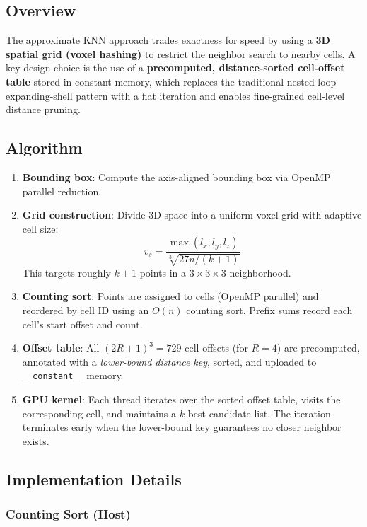 \documentclass[11pt,a4paper]{article}
\begin{document}
\subsection{Overview}

The approximate KNN approach trades exactness for speed by using a \textbf{3D spatial grid (voxel hashing)} to restrict the neighbor search to nearby cells. A key design choice is the use of a \textbf{precomputed, distance-sorted cell-offset table} stored in constant memory, which replaces the traditional nested-loop expanding-shell pattern with a flat iteration and enables fine-grained cell-level distance pruning.

\subsection{Algorithm}

\begin{enumerate}
    \item \textbf{Bounding box}: Compute the axis-aligned bounding box via OpenMP parallel reduction.
    \item \textbf{Grid construction}: Divide 3D space into a uniform voxel grid with adaptive cell size:
    \[
        v_s = \frac{\max(l_x, l_y, l_z)}{\sqrt[3]{27n / (k+1)}}
    \]
    This targets roughly $k{+}1$ points in a $3 \times 3 \times 3$ neighborhood.
    \item \textbf{Counting sort}: Points are assigned to cells (OpenMP parallel) and reordered by cell ID using an $O(n)$ counting sort. Prefix sums record each cell's start offset and count.
    \item \textbf{Offset table}: All $(2R{+}1)^3 = 729$ cell offsets (for $R{=}4$) are precomputed, annotated with a \emph{lower-bound distance key}, sorted, and uploaded to \texttt{\_\_constant\_\_} memory.
    \item \textbf{GPU kernel}: Each thread iterates over the sorted offset table, visits the corresponding cell, and maintains a $k$-best candidate list. The iteration terminates early when the lower-bound key guarantees no closer neighbor exists.
\end{enumerate}

\subsection{Implementation Details}

\subsubsection{Counting Sort (Host)}
\end{document}
